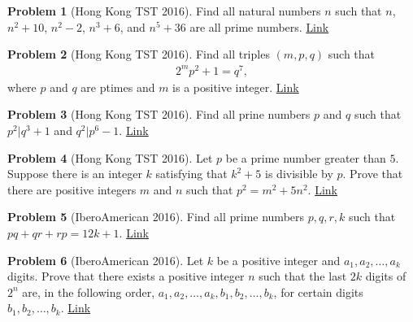 \documentclass[]{article}
\theoremstyle{definition}
\newtheorem{problem}{Problem}
\begin{document}
\begin{problem}[Hong Kong TST 2016]
	Find all natural numbers $n$ such that $n$, $n^2+10$, $n^2-2$, $n^3+6$, and $n^5+36$ are all prime numbers. \hfill \href{http://artofproblemsolving.com/community/c6h1155577p5481499}{Link}
\end{problem}



\begin{problem}[Hong Kong TST 2016]
	Find all triples $(m,p,q)$ such that
		\begin{align*}
			2^mp^2 +1=q^7,
		\end{align*}
	where $p$ and $q$ are ptimes and $m$ is a positive integer. \hfill \href{http://artofproblemsolving.com/community/c6h1150516p5442572}{Link}
\end{problem}



\begin{problem}[Hong Kong TST 2016]
	Find all prine numbers $p$ and $q$ such that $p^2|q^3+1$ and $q^2|p^6-1$. \hfill \href{http://artofproblemsolving.com/community/c6h1232696p6240989}{Link}
\end{problem}




\begin{problem}[Hong Kong TST 2016]
	Let $p$ be a prime number greater than $5$. Suppose there is an integer $k$ satisfying that $k^2+5$ is divisible by $p$. Prove that there are positive integers $m$ and $n$ such that $p^2=m^2+5n^2$. \hfill \href{http://artofproblemsolving.com/community/c6h1235235p6270723}{Link}
\end{problem}




\begin{problem}[IberoAmerican 2016]
	Find all prime numbers $p,q,r,k$ such that $pq+qr+rp = 12k+1$. \hfill \href{http://artofproblemsolving.com/community/c6h1311821p7030145}{Link}
\end{problem}




\begin{problem}[IberoAmerican 2016]
	Let $k$ be a positive integer and $a_1, a_2,\dots, a_k$ digits. Prove that there exists a positive integer $n$ such that the last $2k$ digits of $2^n$ are, in the following order, $a_1, a_2,\dots, a_k , b_1, b_2, \dots, b_k$, for certain digits $b_1, b_2, \dots, b_k$. \hfill \href{http://artofproblemsolving.com/community/c6h1312214p7032871}{Link}
\end{problem}
\end{document}
